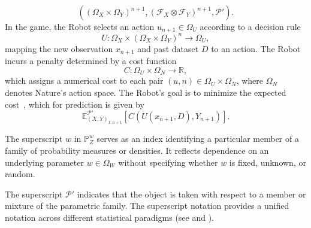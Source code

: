 \begin{definition}
	\begin{equation}
		((\Omega_X \times \Omega_Y)^{n+1}, (\mathcal{F}_X \otimes \mathcal{F}_Y)^{n+1}, \mathcal{P}').
	\end{equation}
	In the game, the Robot selects an action $u_{n+1} \in \Omega_U$ according to a decision rule
	\begin{equation}
		U \colon \Omega_X \times (\Omega_X \times \Omega_Y)^n \to \Omega_U,
	\end{equation}
	mapping the new observation $x_{n+1}$ and past dataset $D$ to an action. The Robot incurs a penalty determined by a cost function
	\begin{equation}
		C \colon \Omega_U \times \Omega_N \to \mathbb{R},
	\end{equation}
	which assigns a numerical cost to each pair $(u, n) \in \Omega_U \times \Omega_N$, where $\Omega_N$ denotes Nature’s action space. The Robot's goal is to minimize the expected cost~\cite{murphy2023probabilistic}, which for prediction is given by
	\begin{equation}
		\mathbb{E}_{(X,Y)_{1\colon n+1}}^{\mathcal{P}'}[C(U(x_{n+1},D), Y_{n+1})].
		\label{eq:expcost}
	\end{equation}
	
\end{definition}

\begin{remark}
	\label{rem:superscript_w}
	The superscript $w$ in $\mathbb{P}_Z^w$ serves as an index identifying a particular member of a family of probability measures or densities. It reflects dependence on an underlying parameter $w \in \Omega_W$ without specifying whether $w$ is fixed, unknown, or random.

	The superscript $\mathcal{P}'$ indicates that the object is taken with respect to a member or mixture of the parametric family. The superscript notation provides a unified notation across different statistical paradigms (see  and ).
\end{remark}


